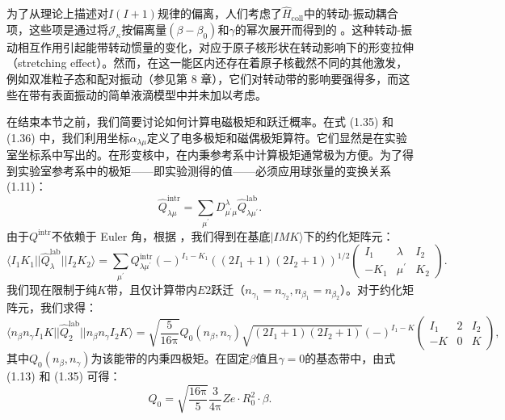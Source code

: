 为了从理论上描述对$I(I+1)$规律的偏离，人们考虑了$\hat{H}_{\text{coll}}$中的转动-振动耦合项，这些项是通过将$\mathcal{J}_{\kappa}$按偏离量$(\beta-\beta_{0})$和$\gamma$的幂次展开而得到的
\cite{FG62,FG64,FGS65,FGS66,ABP68}。这种转动-振动相互作用引起能带转动惯量的变化，对应于原子核形状在转动影响下的形变拉伸（stretching
effect）。然而，在这一能区内还存在着原子核截然不同的其他激发，例如双准粒子态和配对振动（参见第 8 章），它们对转动带的影响要强得多，而这些在带有表面振动的简单液滴模型中并未加以考虑。

在结束本节之前，我们简要讨论如何计算电磁极矩和跃迁概率。在式 (1.35) 和 (1.36) 中，我们利用坐标$\alpha_{\lambda\mu}$定义了电多极矩和磁偶极矩算符。它们显然是在实验室坐标系中写出的。在形变核中，在内秉参考系中计算极矩通常极为方便。为了得到实验室参考系中的极矩——即实验测得的值——必须应用球张量的变换关系
(1.11)：
\begin{equation}
\hat{Q}^{\text{intr}}_{\lambda\mu}=\sum_{\mu^{\prime}}D^{\lambda}_{\mu^{\prime}\mu}\hat{Q}^{\text{lab}}_{\lambda\mu^{\prime}}.\label{eq:1.69}
\end{equation}
由于$Q^{\text{intr}}$不依赖于 Euler 角，根据 \cite[式 4.6.2 和 5.4.1]{Ed57}，我们得到在基底$|IMK\rangle$下的约化矩阵元：
\begin{equation}
\langle I_{1}K_{1}||\hat{Q}^{\text{lab}}_{\lambda}||I_{2}K_{2}\rangle=\sum_{\mu^{\prime}}Q^{\text{intr}}_{\lambda\mu^{\prime}}(-)^{I_{1}-K_{1}}((2I_{1}+1)(2I_{2}+1))^{1/2}\begin{pmatrix}I_{1} & \lambda & I_{2}\\
-K_{1} & \mu^{\prime} & K_{2}
\end{pmatrix}.\label{eq:1.70}
\end{equation}
我们现在限制于纯$K$带，且仅计算带内$E2$跃迁（$n_{\gamma_{1}}=n_{\gamma_{2}},n_{\beta_{1}}=n_{\beta_{2}}$）。对于约化矩阵元，我们求得：
\begin{equation}
\langle n_{\beta}n_{\gamma}I_{1}K||\hat{Q}^{\text{lab}}_{2}||n_{\beta}n_{\gamma}I_{2}K\rangle=\sqrt{\frac{5}{16\mathrm{\pi}}}Q_{0}(n_{\beta},n_{\gamma})\sqrt{(2I_{1}+1)(2I_{2}+1)}(-)^{I_{1}-K}\begin{pmatrix}I_{1} & 2 & I_{2}\\
-K & 0 & K
\end{pmatrix},\label{eq:1.71}
\end{equation}
其中$Q_{0}(n_{\beta},n_{\gamma})$为该能带的内秉四极矩。在固定$\beta$值且$\gamma=0$的基态带中，由式
(1.13) 和 (1.35) 可得：
\begin{equation}
Q_{0}=\sqrt{\frac{16\mathrm{\pi}}{5}}\frac{3}{4\mathrm{\pi}}Ze\cdot R^{2}_{0}\cdot\beta.\label{eq:1.72}
\end{equation}

